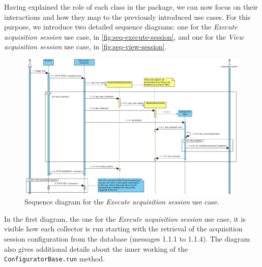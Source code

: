 Having explained the role of each class in the package, we can now focus on their interactions and how they map to the previously introduced use cases. For this purpose, we introduce two detailed sequence diagrams: one for the \emph{Execute acquisition session} use case, in \vref{fig:seq-execute-session}, and one for the \emph{View acquisition session} use case, in \vref{fig:seq-view-session}.

\begin{figure}
  \includegraphics[height=\linewidth,angle=90,origin=c]{images/diagrams/seq-execute-session}
  \caption{Sequence diagram for the \emph{Execute acquisition session} use case.}
  \label{fig:seq-execute-session}
\end{figure}

In the first diagram, the one for the \emph{Execute acquisition session} use case, it is visible how each collector is run starting with the retrieval of the acquisition session configuration from the database (messages 1.1.1 to 1.1.4). The diagram also gives additional details about the inner working of the \texttt{ConfiguratorBase.run} method.


